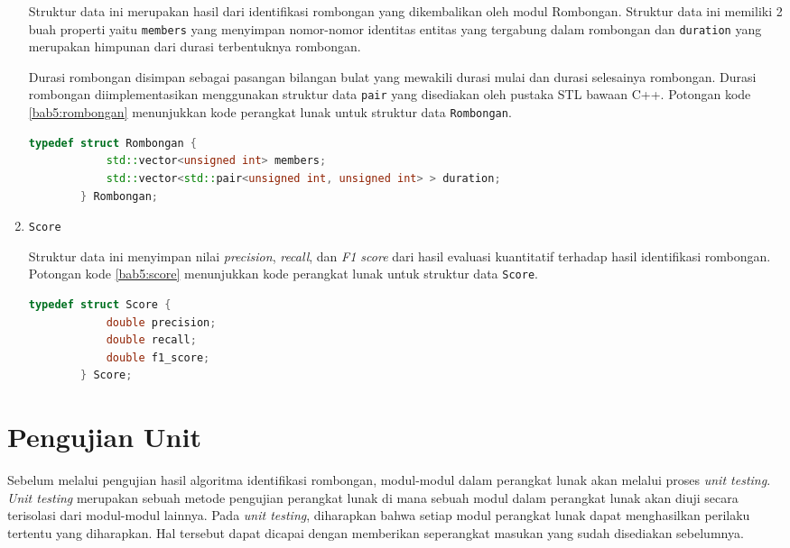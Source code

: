 \begin{enumerate}
    Struktur data ini merupakan hasil dari identifikasi rombongan yang dikembalikan oleh modul Rombongan. Struktur data ini memiliki 2 buah properti yaitu \texttt{members} yang menyimpan nomor-nomor identitas entitas yang tergabung dalam rombongan dan \texttt{duration} yang merupakan himpunan dari durasi terbentuknya rombongan.
    
    Durasi rombongan disimpan sebagai pasangan bilangan bulat yang mewakili durasi mulai dan durasi selesainya rombongan. Durasi rombongan diimplementasikan menggunakan struktur data \texttt{pair} yang disediakan oleh pustaka STL bawaan C++. Potongan kode \ref{bab5:rombongan} menunjukkan kode perangkat lunak untuk struktur data \texttt{Rombongan}.
    
    \begin{lstlisting}[language=C++, caption=Implementasi \texttt{Rombongan}, label={bab5:rombongan}]
        typedef struct Rombongan {
            std::vector<unsigned int> members;
            std::vector<std::pair<unsigned int, unsigned int> > duration;
        } Rombongan;
    \end{lstlisting}
    
    \item \texttt{Score}
    
    Struktur data ini menyimpan nilai \textit{precision}, \textit{recall}, dan \textit{F1 score} dari hasil evaluasi kuantitatif terhadap hasil identifikasi rombongan. Potongan kode \ref{bab5:score} menunjukkan kode perangkat lunak untuk struktur data \texttt{Score}.
    
    \begin{lstlisting}[language=C++, caption=Implementasi \texttt{Score}, label={bab5:score}]
        typedef struct Score {
            double precision;
            double recall;
            double f1_score;
        } Score;
    \end{lstlisting}
\end{enumerate}

\section{Pengujian Unit}
\label{sec:unit-test}

Sebelum melalui pengujian hasil algoritma identifikasi rombongan, modul-modul dalam perangkat lunak akan melalui proses \textit{unit testing}. \textit{Unit testing} merupakan sebuah metode pengujian perangkat lunak di mana sebuah modul dalam perangkat lunak akan diuji secara terisolasi dari modul-modul lainnya. Pada \textit{unit testing}, diharapkan bahwa setiap modul perangkat lunak dapat menghasilkan perilaku tertentu yang diharapkan. Hal tersebut dapat dicapai dengan memberikan seperangkat masukan yang sudah disediakan sebelumnya.

